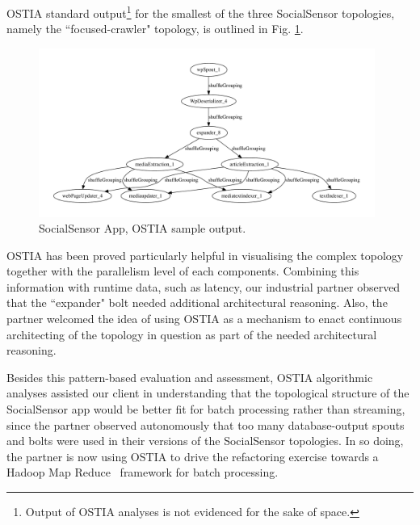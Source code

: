 OSTIA standard output\footnote{Output of OSTIA analyses is not evidenced for the
sake of space.} for the smallest of the three SocialSensor topologies, namely
the ``focused-crawler" topology, is outlined in Fig. \ref{topo1}.

\begin{figure}
\begin{center}
		\includegraphics[width=11cm]{images/output/focused_crawler}
		\caption{SocialSensor App, OSTIA sample output.}
		\label{topo1}
		\end{center}
\end{figure}

OSTIA has been proved particularly helpful in visualising the complex topology
together with the parallelism level of each components. Combining this
information with runtime data, such as latency, our industrial partner observed
that the ``expander" bolt needed additional architectural reasoning. 
Also, the
partner welcomed the idea of using OSTIA as a mechanism to enact continuous
architecting of the topology in question as part of the needed architectural
reasoning.

Besides this pattern-based evaluation and assessment, OSTIA algorithmic analyses
assisted our client in understanding that the topological structure of the
SocialSensor app would be better fit for batch processing rather than streaming,
since the partner observed autonomously that too many database-output spouts and
bolts were used in their versions of the SocialSensor topologies. In so doing,
the partner is now using OSTIA to drive the refactoring exercise towards a
Hadoop Map Reduce~\cite{hadoop}
framework for batch processing.


